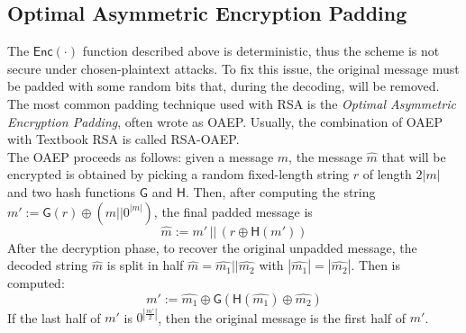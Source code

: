 \subsection{Optimal Asymmetric Encryption Padding}
The $\mathsf{Enc(\cdot)}$ function described above is deterministic, thus the scheme is not secure under chosen-plaintext attacks. To fix this issue, the original message must be padded with some random bits that, during the decoding, will be removed. The most common padding technique used with RSA is the \emph{Optimal Asymmetric Encryption Padding}, often wrote as OAEP. Usually, the combination of OAEP with Textbook RSA is called RSA-OAEP.\\
The OAEP proceeds as follows: given a message $m$, the message $\hat{m}$ that will be encrypted is obtained by picking a random fixed-length string $r$ of length $2|m|$ and two hash functions $\mathsf{G}$ and $\mathsf{H}$. Then, after computing the string $m' := \mathsf{G}(r) \oplus (m||0^{|m|})$, the final padded message is
$$
    \hat{m} := m' \, || \, (r \oplus \mathsf{H}(m'))
$$
After the decryption phase, to recover the original unpadded message, the decoded string $\hat{m}$ is split in half $\hat{m} = \hat{m_1}||\hat{m_2}$ with $|\hat{m_1}|=|\hat{m_2}|$. Then is computed:
$$
    m' := \hat{m_1} \oplus \mathsf{G}(\mathsf{H}(\hat{m_1}) \oplus \hat{m_2})
$$
If the last half of $m'$ is $0^{|\frac{m'}{2}|}$, then the original message is the first half of $m'$.
